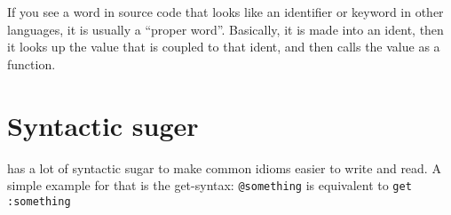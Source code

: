 If you see a word in \dv source code that looks like an identifier or
keyword in other languages, it is usually a ``proper word''. Basically, it is made into an
ident, then it looks up the value that is coupled to that ident, and
then calls the value as a function.

\section{Syntactic suger}
\dv has a lot of syntactic sugar to make common idioms easier to write
and read. A simple example for that is the get-syntax: \verb!@something!
is equivalent to \verb!get :something!
